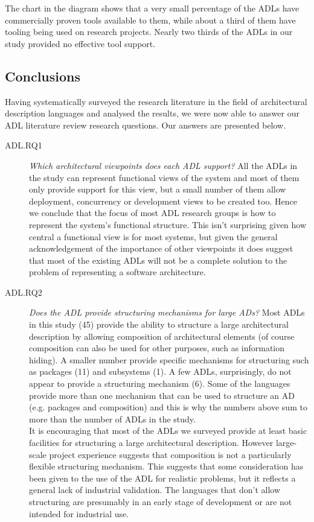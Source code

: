 The chart in the diagram shows that a very small percentage of the ADLs have commercially proven tools available to them, while about a third of them have tooling being used on research projects.  Nearly two thirds of the ADLs in our study provided no effective tool support.

\subsection{Conclusions}

Having systematically surveyed the research literature in the field of architectural description languages and analysed the results, we were now able to answer our ADL literature review research questions.  Our answers are presented below.

\begin{description}
\item[ADL.RQ1] \emph{Which architectural viewpoints does each ADL support?}
All the ADLs in the study can represent functional views of the system and most of them only provide support for this view, but a small number of them allow deployment, concurrency or development views to be created too. Hence we conclude that the focus of most ADL research groups is how to represent the system's functional structure. This isn't surprising given how central a functional view is for most systems, but given the general acknowledgement of the importance of other viewpoints \cite{bachmann2011-documenting, brown2018-sad, kruchten1995-4plus1, rozanski2011-ssa2e} it does suggest that most of the existing ADLs will not be a complete solution to the problem of representing a software architecture.

\item[ADL.RQ2] \emph{Does the ADL provide structuring mechanisms for large ADs?}
Most ADLs in this study (45) provide the ability to structure a large architectural description by allowing composition of architectural elements (of course composition can also be used for other purposes, such as information hiding).   A smaller number provide specific mechanisms for structuring such as packages (11) and subsystems (1).  A few ADLs, surprisingly, do not appear to provide a structuring mechanism (6).  Some of the languages provide more than one mechanism that can be used to structure an AD (e.g. packages and composition) and this is why the numbers above sum to more than the number of ADLs in the study.\\
It is encouraging that most of the ADLs we surveyed provide at least basic facilities for structuring a large architectural description. However large-scale project experience suggests that composition is not a particularly flexible structuring mechanism.  This suggests that some consideration has been given to the use of the ADL for realistic problems, but it reflects a general lack of industrial validation.  The languages that don't allow structuring are presumably in an early stage of development or are not intended for industrial use.


\end{description}
